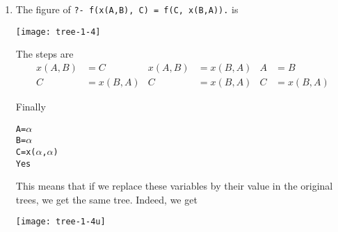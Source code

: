 \begin{enumerate}
  \item The figure of \verb|?- f(x(A,B), C) = f(C, x(B,A)).| is
  \begin{center}
    \texttt{[image: tree-1-4]}
  \end{center}
  \noindent The steps are
  \begin{align*}
    x(A,B) &= C      & x(A,B) &= x(B,A) & A &= B\\
    C      &= x(B,A) & C      &= x(B,A) & C &= x(B,A)
  \end{align*}
  \begin{multicols}{2}
  \noindent Finally
\begin{alltt}
A = \(\alpha\)
B = \(\alpha\)
C = x(\(\alpha\),\(\alpha\)) 
Yes
\end{alltt}
  \par\vfill\columnbreak
  \noindent This means that if we replace these variables by their
  value in the original trees, we get the same tree. Indeed, we get
  \begin{center}
    \texttt{[image: tree-1-4u]}
  \end{center}
  \end{multicols}

\end{enumerate}
